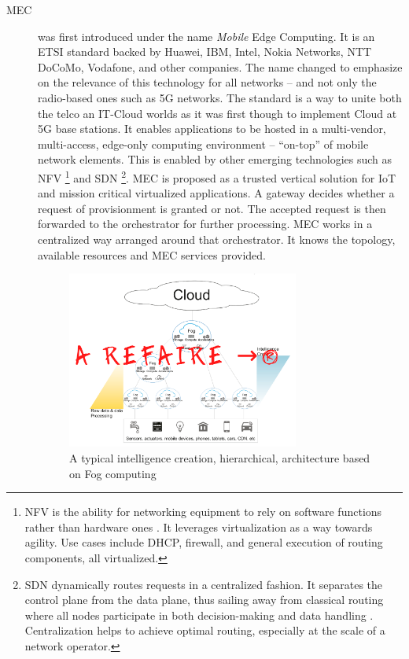 \documentclass[11pt]{sdm}
\begin{document}
\begin{description}
	\item[\acrfull{MEC}] was first introduced under the name \emph{Mobile} Edge Computing. It is an \gls{ETSI} standard backed by Huawei, IBM, Intel, Nokia Networks, NTT DoCoMo, Vodafone, and other companies. The name changed to emphasize on the relevance of this technology for all networks -- and not only the radio-based ones such as 5G networks. The standard is a way to unite both the telco an IT-Cloud worlds \cite{dahmen-lhuissier_etsi_nodate-1} as it was first though to implement Cloud at 5G base stations. It enables applications to be hosted in a multi-vendor, multi-access, edge-only computing environment -- ``on-top'' of mobile network elements. This is enabled by other emerging technologies such as \gls{NFV} \footnote{\acrfull{NFV} is the ability for networking equipment to rely on software functions rather than hardware ones \cite{redhat_what_2019}. It leverages virtualization as a way towards agility. Use cases include DHCP, firewall, and general execution of routing components, all virtualized.} and \gls{SDN} \footnote{\acrfull{SDN} dynamically routes requests in a centralized fashion. It separates the control plane from the data plane, thus sailing away from classical routing where all nodes participate in both decision-making and data handling \cite{redhat_what_2019}. Centralization helps to achieve optimal routing, especially at the scale of a network operator.}. \gls{MEC} is proposed as a trusted vertical solution for \gls{IoT} and mission critical virtualized applications.
		A gateway decides whether a request of provisionment is granted or not. The accepted request is then forwarded to the orchestrator for further processing. \gls{MEC} works in a centralized way arranged around that orchestrator. It knows the topology, available resources and \gls{MEC} services provided.

		\begin{figure}[t]
			\centering
			\includegraphics[width=0.75\textwidth]{./assets/FogArchi.png}
			\caption{A typical intelligence creation, hierarchical, architecture based on Fog computing}
			\label{fig:fog_archi}
		\end{figure}


\end{description}
\end{document}
